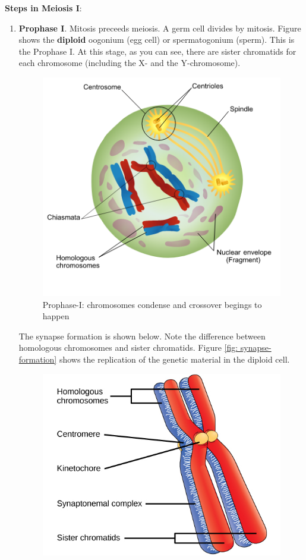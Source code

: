 \documentclass[12pt]{article}
\begin{document}
\textbf{Steps in Meiosis I}:
\begin{enumerate}
    \item \textbf{Prophase I}. Mitosis preceeds meiosis. A germ cell divides by mitosis. Figure shows the \textbf{diploid} oogonium (egg cell) or spermatogonium (sperm). This is the Prophase I. At this stage, as you can see, there are sister chromatids for each chromosome (including the X- and the Y-chromosome). 
\begin{figure}[h!]
    \centering
    \includegraphics[scale=0.4]{prophase-I.png}
    \caption{Prophase-I: chromosomes condense and crossover begings to happen}
    \label{fig: prophase-I}
\end{figure}
        The synapse formation is shown below. Note the difference between homologous chromosomes and sister chromatids. Figure \ref{fig: synapse-formation} shows the replication of the genetic material in the diploid cell. 
\begin{figure}[h!]
    \centering
    \includegraphics[scale=0.4]{synapse-formation.jpeg}

\end{figure}
\end{enumerate}
\end{document}
